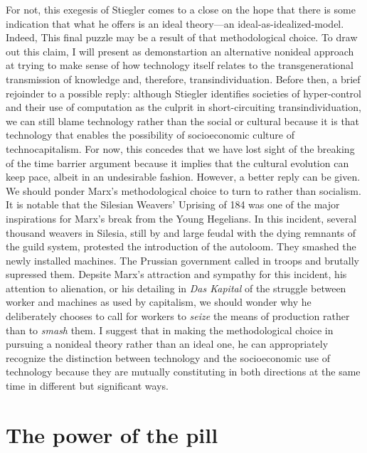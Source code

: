 \documentclass[letterpaper,notitlepage,12pt]{article}
\begin{document}
For not, this exegesis of Stiegler comes to a close on the hope that there is
some indication that what he offers is an ideal theory---an
ideal-as-idealized-model.
Indeed, This final puzzle may be a result of that methodological choice.
To draw out this claim, I will present as demonstartion an alternative nonideal
approach at trying to make sense of how technology itself relates to the
transgenerational transmission of knowledge and, therefore, transindividuation.
Before then, a brief rejoinder to a possible reply: although Stiegler identifies
societies of hyper-control and their use of computation as the culprit in
short-circuiting transindividuation, we can still blame technology rather than
the social or cultural because it is that technology that enables the
possibility of socioeconomic culture of technocapitalism.
For now, this concedes that we have lost sight of the breaking of the time
barrier argument because it implies that the cultural evolution can keep pace,
albeit in an undesirable fashion.
However, a better reply can be given.
We should ponder Marx's methodological choice to turn to 
rather than  socialism.
It is notable that the Silesian Weavers' Uprising of 184 was one of the major
inspirations for Marx's break from the Young Hegelians.
In this incident, several thousand weavers in Silesia, still by and large feudal
with the dying remnants of the guild system, protested the introduction of the
autoloom.
They smashed the newly installed machines.
The Prussian government called in troops and brutally supressed them.
Depsite Marx's attraction and sympathy for this incident, his attention to
alienation, or his detailing in \textit{Das Kapital} of the struggle between
worker and machines as used by capitalism, we should wonder why he deliberately
chooses to call for workers to \textit{seize} the means of production rather
than to \textit{smash} them.
I suggest that in making the methodological choice in pursuing a nonideal theory
rather than an ideal one, he can appropriately recognize the distinction between
technology and the socioeconomic use of technology because they are mutually
constituting in both directions at the same time in different but significant
ways.

\section{The power of the pill}

\end{document}
